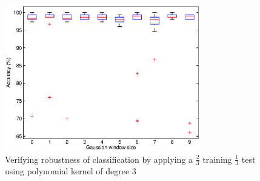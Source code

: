 \documentclass[remotesensing,article,accept,moreauthors,pdftex,12pt,a4paper]{mdpi}
\newcommand\red[1]{\textcolor{red}{#1}} %
\begin{document}
\begin{figure}[t]
  \centering
  \includegraphics[height=2.5in,keepaspectratio]{./images/atcor_flaash/robustness.eps}
   \caption{Verifying robustness of classification by applying a $\frac{2}{3}$ training $\frac{1}{3}$ test using polynomial kernel of degree 3}
       \label{fig:robustness}

\end{figure}








% 
% 
\end{document}
